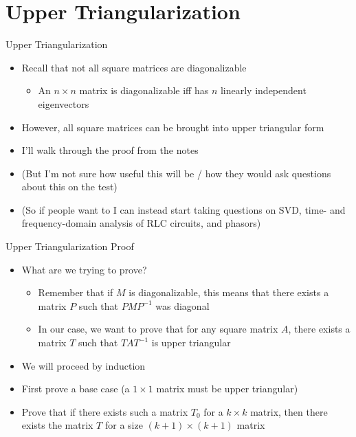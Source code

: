 \section{Upper Triangularization}


\begin{frame}{Upper Triangularization}

    \begin{itemize}
        \item
Recall that not all square matrices are diagonalizable
            \begin{itemize}
        \item
           An \(n \times n\) matrix is diagonalizable iff has \(n\) linearly independent eigenvectors
            \end{itemize}
        \item
However, all square matrices can be brought into upper triangular form
        \item
I’ll walk through the proof from the notes
        \item
(But I’m not sure how useful this will be / how they would ask questions about this on the test)
        \item
(So if people want to I can instead start taking questions on SVD, time- and frequency-domain analysis of RLC circuits, and phasors)
    \end{itemize}
\end{frame}

\begin{frame}{Upper Triangularization Proof}
    \begin{itemize}
        \item What are we trying to prove?
            \begin{itemize}
                \item
                    Remember that if \(M\) is diagonalizable, this means that there exists a matrix \(P\) such that \(PMP^{-1}\) was diagonal
                \item In our case, we want to prove that for any square matrix \(A\), there exists a matrix \(T\) such that \(TAT^{-1}\) is upper triangular
            \end{itemize}
        \item We will proceed by induction
        \item First prove a base case (a \(1 \times 1\) matrix must be upper triangular)
        \item  Prove that if there exists such a matrix \(T_0\) for a \(k \times k\) matrix, then there exists the matrix \(T\) for a size \((k+1) \times (k+1)\) matrix
    \end{itemize}
\end{frame}

